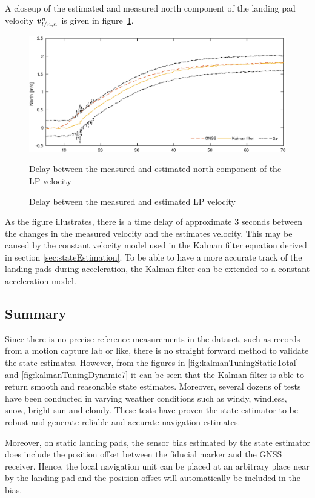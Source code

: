A closeup of the estimated and measured north component of the landing pad velocity $\boldsymbol{v}^n_{l/n,n}$ is given in figure~\ref{fig:dynamic_7_vel_closeup}.
\begin{figure}[!ht]
	\centering
	\includegraphics[width=.9\linewidth]{img/plot/dynamic/dynamic_7_vel_closeup.eps}
	\caption{Delay between the measured and estimated LP velocity}{Delay between the measured and estimated north component of the LP velocity}
	\label{fig:dynamic_7_vel_closeup}
\end{figure}
As the figure illustrates, there is a time delay of approximate 3 seconds between the changes in the measured velocity and the estimates velocity. This may be caused by the constant velocity model used in the Kalman filter equation derived in section \ref{sec:stateEstimation}. To be able to have a more accurate track of the landing pads during acceleration, the Kalman filter can be extended to a constant acceleration model. 

\subsection{Summary} %
\label{sub:kf_summary}
Since there is no precise reference measurements in the dataset, such as records from a motion capture lab or like, there is no straight forward method to validate the state estimates. However, from the figures in \ref{fig:kalmanTuningStaticTotal} and \ref{fig:kalmanTuningDynamic7} it can be seen that the Kalman filter is able to return smooth and reasonable state estimates. Moreover, several dozens of tests have been conducted in varying weather conditions such as windy, windless, snow, bright sun and cloudy. These tests have proven the state estimator to be robust and generate reliable and accurate navigation estimates.

Moreover, on static landing pads, the sensor bias estimated by the state estimator does include the position offset between the fiducial marker and the \gls{GNSS} receiver. Hence, the local navigation unit can be placed at an arbitrary place near by the landing pad and the position offset will automatically be included in the bias. 
